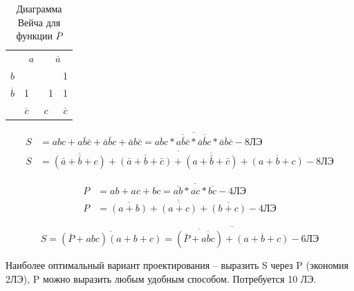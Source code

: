 \documentclass[a4paper,14pt]{article}
\begin{document}
\begin{table}[H]
	\begin{center}
		\caption{\label{tab:tab5} Диаграмма Вейча для функции $\overline{P}$}
		\begin{tabular}{ccccc}
			& \multicolumn{2}{c}{$a$}                           & \multicolumn{2}{c}{$\overline{a}$}                          \\ \cline{2-5} 
			\multicolumn{1}{c|}{$b$}  & \multicolumn{1}{c|}{}  & \multicolumn{1}{c|}{} & \multicolumn{1}{c|}{}  & \multicolumn{1}{c|}{1} \\ \cline{2-5} 
			\multicolumn{1}{c|}{$\overline{b}$} & \multicolumn{1}{c|}{1} & \multicolumn{1}{c|}{}  & \multicolumn{1}{c|}{1} & \multicolumn{1}{c|}{1}  \\ \cline{2-5} 
			& $\overline{c}$                     & \multicolumn{2}{c}{$c$}                          & $\overline{c}$                     
		\end{tabular}
	\end{center}
\end{table}

\begin{equation*}
\begin{aligned}
	S &= abc + a\bar{b}\bar{c} + \bar{a}\bar{b}c + \bar{a}b\bar{c} = \overline{\overline{abc} * \overline{a\bar{b}\bar{c}} * \overline{\bar{a}\bar{b}c} * \overline{\bar{a}b\bar{c}}} - \text{8ЛЭ} \\
	S &= \overline{\overline{(\bar{a}+\bar{b}+c)} + \overline{(\bar{a}+b+\bar{c})} + \overline{(a+\bar{b}+\bar{c})} + \overline{(a+b+c)}} - \text{8ЛЭ}
\end{aligned}
\end{equation*}

\begin{equation*}
\begin{aligned}
	P &= ab + ac + bc = \overline{\overline{ab} * \overline{ac} * \overline{bc}} - \text{4ЛЭ} \\
	P &= \overline{\overline{(a+b)} + \overline{(a+c)} + \overline{(b+c)}} - \text{4ЛЭ}
\end{aligned}
\end{equation*}

\begin{equation*}
	S = \overline{(\bar{P} + abc) (a + b + c)} = \overline{\overline{(\bar{P} + \overline{\overline{abc}})} + \overline{(a+b+c)}} - \text{6ЛЭ}
\end{equation*}

Наиболее оптимальный вариант проектирования -- выразить S через P (экономия 2ЛЭ), P можно выразить любым удобным способом.
Потребуется 10 ЛЭ.
\end{document}

